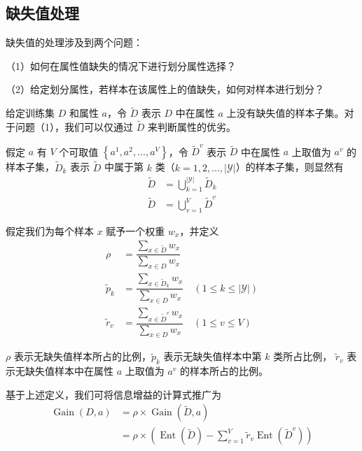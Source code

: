 \subsection{缺失值处理}
缺失值的处理涉及到两个问题：

（1）如何在属性值缺失的情况下进行划分属性选择？ 

（2）给定划分属性，若样本在该属性上的值缺失，如何对样本进行划分？

给定训练集 $D$ 和属性 $a$，令 $\tilde{D}$ 表示 $D$ 中在属性 $a$ 上没有缺失值的样本子集。对于问题（1），我们可以仅通过 $\tilde{D}$ 来判断属性的优劣。

假定 $a$ 有 $V$ 个可取值 $\left\{a^1, a^2, \dots, a^V\right\}$，令 $\tilde{D}^v$ 表示 $\tilde{D}$ 
中在属性 $a$ 上取值为 $a^v$ 的样本子集，$\tilde{D}_k$ 表示 $\tilde{D}$ 
中属于第 $k$ 类（$k = 1, 2, \dots, |\mathcal Y|$）的样本子集，则显然有
\begin{equation}
    \begin{aligned}
        \tilde{D} &= \bigcup\limits_{k=1}^{|\mathcal Y|} \tilde{D}_k \\
        \tilde{D} &= \bigcup\limits_{v=1}^V \tilde{D}^v
        \end{aligned}
\end{equation}

假定我们为每个样本 $x$ 赋予一个权重 $w_x$，并定义
\begin{equation}
    \begin{aligned}
        \rho &= \dfrac{\sum_{x \in \tilde{D}}w_x}{\sum_{x \in D} w_x} \\
        \tilde{p}_k &= \dfrac{\sum_{x \in \tilde{D}_k} w_x}{\sum_{x \in D} w_x}\quad (1 \leq k \leq |\mathcal Y|) \\
        \tilde{r}_v &= \dfrac{\sum_{x \in \tilde{D}^v} w_x}{\sum_{x \in D} w_x}\quad (1 \leq v \leq V)
        \end{aligned}
\end{equation}

$\rho$ 表示无缺失值样本所占的比例，$\tilde{p}_k$ 表示无缺失值样本中第 $k$ 类所占比例，
$\tilde{r}_v$ 表示无缺失值样本中在属性 $a$ 上取值为 $a^v$ 的样本所占的比例。

基于上述定义，我们可将信息增益的计算式推广为
\begin{equation}
  \begin{aligned}
\operatorname{Gain}(D, a) &= \rho \times \operatorname{Gain}(\tilde{D}, a) \\
&= \rho \times \left(\operatorname{Ent}\left(\tilde{D}\right) - \sum\limits_{v=1}^V{\tilde{r}_v\operatorname{Ent}\left(\tilde{D}^v\right)}\right)
\end{aligned}  
\end{equation}

